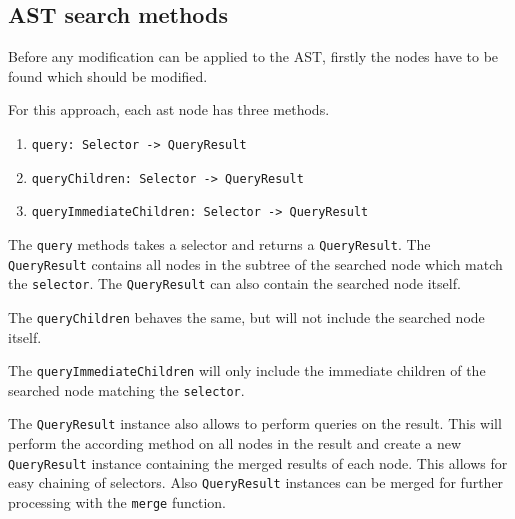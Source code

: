 
\subsection{AST search methods}

Before any modification can be applied to the AST, firstly the nodes have to be found which should be modified.

For this approach, each ast node has three methods.

\begin{enumerate}
\item \verb|query: Selector -> QueryResult|
\item \verb|queryChildren: Selector -> QueryResult|
\item \verb|queryImmediateChildren: Selector -> QueryResult|
\end{enumerate}

The \verb|query| methods takes a selector and returns a \verb|QueryResult|. The \verb|QueryResult| contains all nodes in the subtree of the searched node which match the \verb|selector|. The \verb|QueryResult| can also contain the searched node itself.

The \verb|queryChildren| behaves the same, but will not include the searched node itself.

The \verb|queryImmediateChildren| will only include the immediate children of the searched node matching the \verb|selector|.

The \verb|QueryResult| instance also allows to perform queries on the result. This will perform the according method on all nodes in the result and create a new \verb|QueryResult| instance containing the merged results of each node. This allows for easy chaining of selectors. Also \verb|QueryResult| instances can be merged for further processing with the \verb|merge| function.
